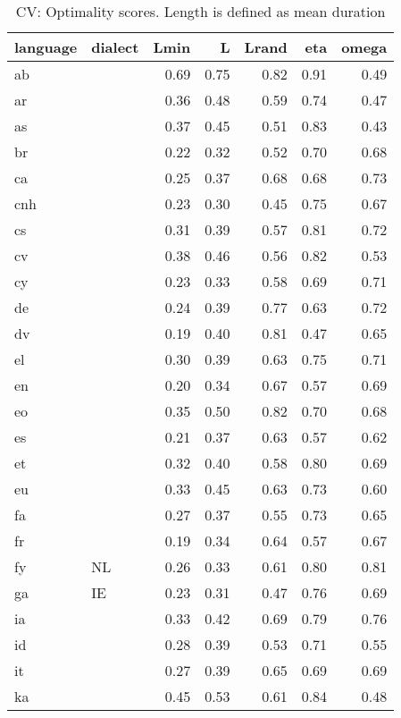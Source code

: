 \begin{table}[H]
\centering
\caption{CV: Optimality scores. Length is defined as mean duration} 
\label{tab:opt_scores_cv_meanDuration}
\begin{tabular}{llrrrrr}
  \hline
language & dialect & Lmin & L & Lrand & eta & omega \\ 
  \hline
ab &  & 0.69 & 0.75 & 0.82 & 0.91 & 0.49 \\ 
  ar &  & 0.36 & 0.48 & 0.59 & 0.74 & 0.47 \\ 
  as &  & 0.37 & 0.45 & 0.51 & 0.83 & 0.43 \\ 
  br &  & 0.22 & 0.32 & 0.52 & 0.70 & 0.68 \\ 
  ca &  & 0.25 & 0.37 & 0.68 & 0.68 & 0.73 \\ 
  cnh &  & 0.23 & 0.30 & 0.45 & 0.75 & 0.67 \\ 
  cs &  & 0.31 & 0.39 & 0.57 & 0.81 & 0.72 \\ 
  cv &  & 0.38 & 0.46 & 0.56 & 0.82 & 0.53 \\ 
  cy &  & 0.23 & 0.33 & 0.58 & 0.69 & 0.71 \\ 
  de &  & 0.24 & 0.39 & 0.77 & 0.63 & 0.72 \\ 
  dv &  & 0.19 & 0.40 & 0.81 & 0.47 & 0.65 \\ 
  el &  & 0.30 & 0.39 & 0.63 & 0.75 & 0.71 \\ 
  en &  & 0.20 & 0.34 & 0.67 & 0.57 & 0.69 \\ 
  eo &  & 0.35 & 0.50 & 0.82 & 0.70 & 0.68 \\ 
  es &  & 0.21 & 0.37 & 0.63 & 0.57 & 0.62 \\ 
  et &  & 0.32 & 0.40 & 0.58 & 0.80 & 0.69 \\ 
  eu &  & 0.33 & 0.45 & 0.63 & 0.73 & 0.60 \\ 
  fa &  & 0.27 & 0.37 & 0.55 & 0.73 & 0.65 \\ 
  fr &  & 0.19 & 0.34 & 0.64 & 0.57 & 0.67 \\ 
  fy & NL & 0.26 & 0.33 & 0.61 & 0.80 & 0.81 \\ 
  ga & IE & 0.23 & 0.31 & 0.47 & 0.76 & 0.69 \\ 
  ia &  & 0.33 & 0.42 & 0.69 & 0.79 & 0.76 \\ 
  id &  & 0.28 & 0.39 & 0.53 & 0.71 & 0.55 \\ 
  it &  & 0.27 & 0.39 & 0.65 & 0.69 & 0.69 \\ 
  ka &  & 0.45 & 0.53 & 0.61 & 0.84 & 0.48 \\ 

\end{tabular}
\end{table}
